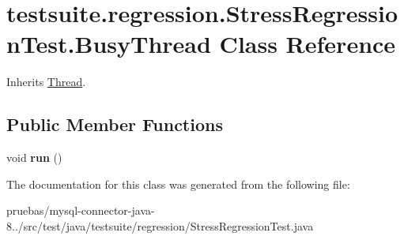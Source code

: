 \hypertarget{classtestsuite_1_1regression_1_1_stress_regression_test_1_1_busy_thread}{}\section{testsuite.\+regression.\+Stress\+Regression\+Test.\+Busy\+Thread Class Reference}
\label{classtestsuite_1_1regression_1_1_stress_regression_test_1_1_busy_thread}


Inherits \mbox{\hyperlink{class_thread}{Thread}}.

\subsection*{Public Member Functions}
\begin{DoxyCompactItemize}
\item 
\mbox{\label{classtestsuite_1_1regression_1_1_stress_regression_test_1_1_busy_thread_a2915a9211f51eddf7bdd522a7c285a97}} 
void {\bfseries run} ()
\end{DoxyCompactItemize}


The documentation for this class was generated from the following file\+:\begin{DoxyCompactItemize}
\item 
pruebas/mysql-\/connector-\/java-\/8../src/test/java/testsuite/regression/Stress\+Regression\+Test.\+java\end{DoxyCompactItemize}
